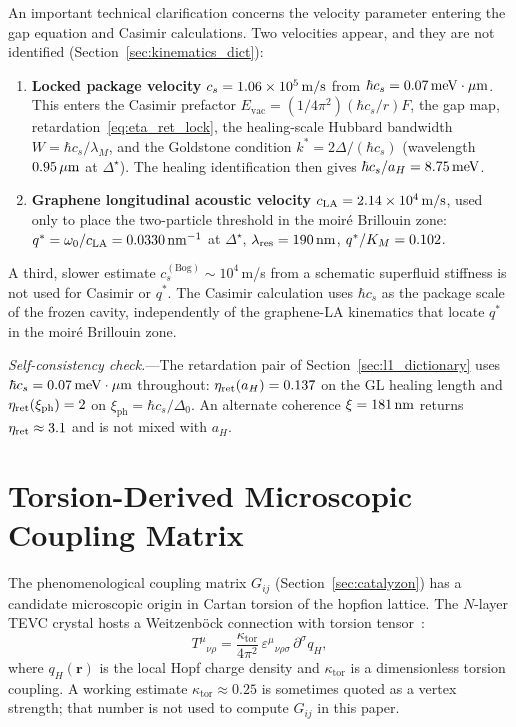 \documentclass[11pt,letterpaper]{article}
\begin{document}
An important technical clarification concerns the velocity parameter entering the gap equation and Casimir calculations. Two velocities appear, and they are not identified (Section~\ref{sec:kinematics_dict}):

\begin{enumerate}
\item \textbf{Locked package velocity} $c_s=1.06\times 10^{5}\,\mathrm{m/s}$ from $\hbar c_s=0.07\,\mathrm{meV\cdot\mu m}$. This enters the Casimir prefactor $E_{\mathrm{vac}}=(1/4\pi^2)(\hbar c_s/r)F$, the gap map, retardation~\eqref{eq:eta_ret_lock}, the healing-scale Hubbard bandwidth $W=\hbar c_s/\lambda_M$, and the Goldstone condition $k^*=2\Delta/(\hbar c_s)$ (wavelength $0.95\,\mu\mathrm{m}$ at $\Delta^\star$). The healing identification then gives $\hbar c_s/a_H=8.75\,\mathrm{meV}$.
\item \textbf{Graphene longitudinal acoustic velocity} $c_{\mathrm{LA}}=2.14\times 10^{4}\,\mathrm{m/s}$, used only to place the two-particle threshold in the moiré Brillouin zone: $q^*=\omega_0/c_{\mathrm{LA}}=0.0330\,\mathrm{nm}^{-1}$ at $\Delta^\star$, $\lambda_{\mathrm{res}}=190\,\mathrm{nm}$, $q^*/K_M=0.102$.
\end{enumerate}

A third, slower estimate $c_s^{(\mathrm{Bog})}\sim 10^4$\,m/s from a schematic superfluid stiffness is not used for Casimir or $q^*$. The Casimir calculation uses $\hbar c_s$ as the package scale of the frozen cavity, independently of the graphene-LA kinematics that locate $q^*$ in the moiré Brillouin zone.

\textit{Self-consistency check.}---The retardation pair of Section~\ref{sec:l1_dictionary} uses $\hbar c_s=0.07\,\mathrm{meV\cdot\mu m}$ throughout: $\eta_{\mathrm{ret}}(a_H)=0.137$ on the GL healing length and $\eta_{\mathrm{ret}}(\xi_{\mathrm{ph}})=2$ on $\xi_{\mathrm{ph}}=\hbar c_s/\Delta_0$. An alternate coherence $\xi=181\,\mathrm{nm}$ returns $\eta_{\mathrm{ret}}\approx3.1$ and is not mixed with $a_H$.

\section{Torsion-Derived Microscopic Coupling Matrix}
\label{sec:torsion_derivation}

The phenomenological coupling matrix $G_{ij}$ (Section~\ref{sec:catalyzon}) has a candidate microscopic origin in Cartan torsion of the hopfion lattice. The $N$-layer TEVC crystal hosts a Weitzenb\"ock connection with torsion tensor~\cite{Nissinen2020,Nissinen2019}:
\begin{equation}
T^{\mu}{}_{\nu\rho} = \frac{\kappa_{\text{tor}}}{4\pi^2}\, \varepsilon^{\mu}{}_{\nu\rho\sigma}\, \partial^{\sigma} q_H,
\label{eq:cartan_torsion}
\end{equation}
where $q_H(\mathbf{r})$ is the local Hopf charge density and $\kappa_{\text{tor}}$ is a dimensionless torsion coupling. A working estimate $\kappa_{\text{tor}}\approx 0.25$ is sometimes quoted as a vertex strength; that number is not used to compute $G_{ij}$ in this paper.
\end{document}
